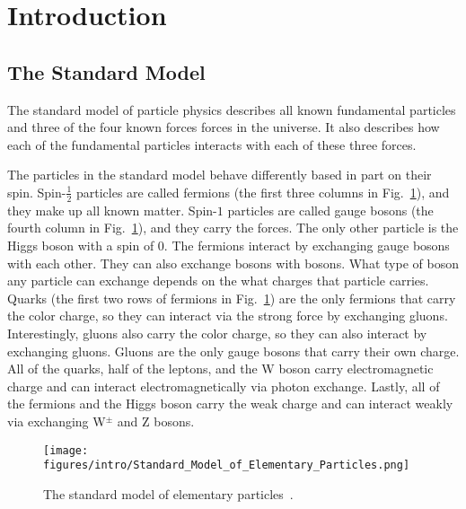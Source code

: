 \section{Introduction} \label{sec:intro}
\hspace{\parindent}

\subsection{The Standard Model}\label{sec:standardmodel}
  The standard model of particle physics describes all known fundamental
  particles and three of the four known forces forces in the universe. It also
  describes how each of the fundamental particles interacts with each of these
  three forces.

  The particles in the standard model behave differently based in part on their
  spin. Spin-$\frac{1}{2}$ particles are called fermions (the first three
  columns in Fig.~\ref{fig:standardmodel}), and they make up all known matter.
  Spin-$1$ particles are called gauge bosons (the fourth column in
  Fig.~\ref{fig:standardmodel}), and they carry the forces.  The only other
  particle is the Higgs boson with a spin of $0$. The fermions interact by
  exchanging gauge bosons with each other. They can also exchange bosons with
  bosons. What type of boson any particle can exchange depends on the what
  charges that particle carries. Quarks (the first two rows of fermions in
  Fig.~\ref{fig:standardmodel}) are the only fermions that carry the color
  charge, so they can interact via the strong force by exchanging gluons.
  Interestingly, gluons also carry the color charge, so they can also interact
  by exchanging gluons. Gluons are the only gauge bosons that carry their own
  charge. All of the quarks, half of the leptons, and the W boson carry
  electromagnetic charge and can interact electromagnetically via photon
  exchange. Lastly, all of the fermions and the Higgs boson carry the weak
  charge and can interact weakly via exchanging W$^{\pm}$ and Z bosons.

  \begin{figure}[ht]
    \centering
    \texttt{[image: figures/intro/Standard\_Model\_of\_Elementary\_Particles.png]}
    \caption{The standard model of elementary particles~\cite{wikipedia}.}
    \label{fig:standardmodel}
  \end{figure}

